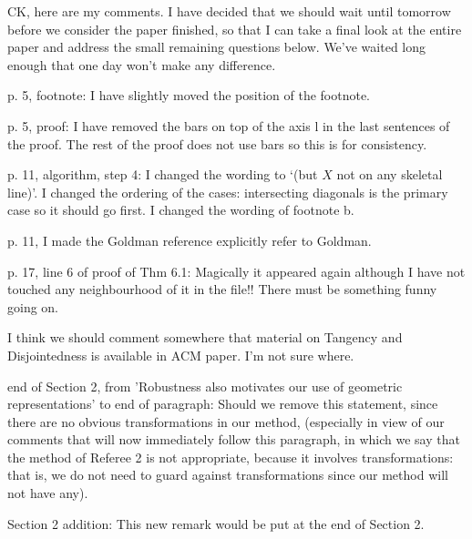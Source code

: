 CK, here are my comments.
I have decided that we should wait until tomorrow before we 
consider the paper finished, so that I can take a final look at the entire
paper and address the small remaining questions below.
We've waited long enough that one day won't make any difference.


p. 5, footnote: I have slightly moved the position of the footnote.
	
p. 5, proof: I have removed the bars on top of the axis l in the last
	sentences of the proof.  The rest of the proof does not use
	bars so this is for consistency.

p. 11, algorithm, step 4: I changed the wording to `(but $X$ not on
	any skeletal line)'.
	I changed the ordering of the cases: intersecting diagonals
	is the primary case so it should go first.
	I changed the wording of footnote b.

p. 11, I made the Goldman reference explicitly refer to Goldman.

p. 17, line 6 of proof of Thm 6.1: Magically it appeared again 
	although I have not touched any neighbourhood of it in the file!!
	There must be something funny going on.

I think we should comment somewhere that material on Tangency and 
Disjointedness is available in ACM paper.  I'm not sure where.

end of Section 2, from 'Robustness also motivates our use
	of geometric representations' to end of paragraph:
	Should we remove this statement, since
	there are no obvious transformations in our method,
	(especially in view of our comments that will now immediately
	follow this paragraph, in which we say that the method
	of Referee 2 is not appropriate, because it involves
	transformations: that is, we do not need to guard against
	transformations since our method will not have any).

Section 2 addition: This new remark would be put at the end of Section 2.

